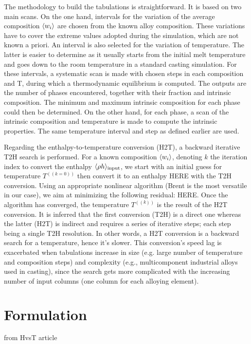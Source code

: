The methodology to build the tabulations is straightforward. It is based on two main scans. On the one hand, intervals for the variation of the 
average composition $\langle w_i \rangle$ are chosen from the known alloy composition. These variations have to cover the extreme values adopted during the 
simulation, which are not known a priori. An interval is also selected for the variation of temperature. The latter is easier to determine as it
usually starts from the initial melt temperature and goes down to the room temperature in a standard casting simulation. For these intervals, a 
systematic scan is made with chosen steps in each composition and T, during which a thermodynamic equilibrium is computed. The outputs are the 
number of phases encountered, together with their fraction and intrinsic composition. The minimum and maximum intrinsic composition for each phase 
could then be determined. On the other hand, for each phase, a scan of the intrinsic composition and temperature is made to compute the intrinsic 
properties. The same temperature interval and step as defined earlier are used.
 
Regarding the enthalpy-to-temperature conversion (H2T), a backward iterative T2H search is performed. For a known composition $\langle w_i \rangle$, denoting $k$
the iteration index to convert the enthalpy $\langle \rho h \rangle_{\text{input}}$, we start with an initial guess for temperature $T^((k=0) )$ then convert it to an 
enthalpy  HERE with the T2H conversion. Using an appropriate nonlinear algorithm (Brent is the most versatile in our case), we aim at minimizing 
the following residual: HERE. Once the algorithm has converged, the temperature $T^((k) )$ is the result of the H2T conversion. 
It is inferred that the first conversion (T2H) is a direct one whereas the latter (H2T) is indirect and requires a series of iterative steps; each step 
being a single T2H resolution. In other words, a H2T conversion is a backward search for a temperature, hence it’s slower. This conversion’s speed lag is 
exacerbated when tabulations increase in size (e.g. large number of temperature and composition steps) and complexity (e.g., multicomponent industrial alloys 
used in casting), since the search gets more complicated with the increasing number of input columns (one column for each alloying element).

\section{Formulation}
from HvsT article

